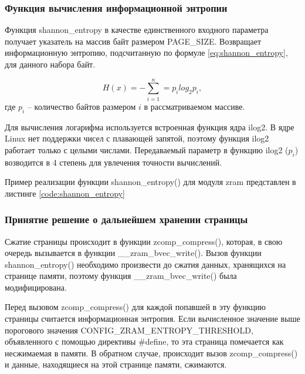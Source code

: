 \subsubsection{Функция вычисления информационной энтропии}

Функция shannon\_entropy в качестве единственного входного параметра получает указатель на массив байт размером PAGE\_SIZE. Возвращает информационную энтропию, подсчитанную по формуле \ref{eq:shannon_entropy}, для данного набора байт.

\begin{equation}\label{eq:shannon_entropy}
	H(x) = -\sum^{n}_{i = 1} = p_{i} log_{2} p_{i},
\end{equation}
где $p_{i}$ -- количество байтов размером $i$ в рассматриваемом массиве.

Для вычисления логарифма используется встроенная функция ядра ilog2. В ядре Linux нет поддержки чисел с плавающей запятой, поэтому функция ilog2 работает только с целыми числами. Передаваемый параметр в функцию ilog2 ($p_{i}$) возводится в 4 степень для увлечения точности вычислений.

Пример реализации функции shannon\_entropy() для модуля zram представлен в листинге \ref{code:shannon_entropy}


\subsubsection{Принятие решение о дальнейшем хранении страницы}

Сжатие страницы происходит в функции zcomp\_compress(), которая, в свою очередь вызывается в функции \_\_zram\_bvec\_write(). Вызов функции\\ shannon\_entropy() необходимо произвести до сжатия данных, хранящихся на странице памяти, поэтому функция \_\_zram\_bvec\_write() была модифицирована. 

Перед вызовом zcomp\_compress() для каждой попавшей в эту функцию страницы считается информационная энтропия. Если вычисленное значение выше порогового значения CONFIG\_ZRAM\_ENTROPY\_THRESHOLD, объявленного с помощью директивы \#define, то эта страница помечается как несжимаемая в памяти. В обратном случае, происходит вызов zcomp\_compress() и данные, находящиеся на этой странице памяти, сжимаются. 

